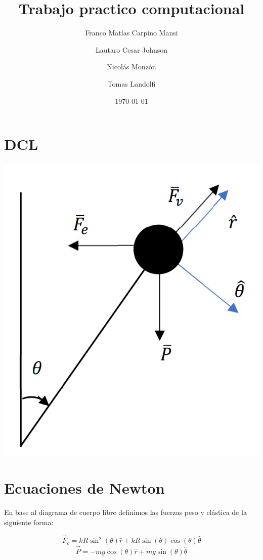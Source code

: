 \documentclass{article}
\title{Trabajo practico computacional}
\author{Franco Matías Carpino Mansi \and Lautaro Cesar Johnson \and Nicol\'as Monz\'on \and Tomas Landolfi}
\date{\today}
\begin{document}
    \maketitle
    
    \section{DCL}
    
    \begin{center}
    \includegraphics[scale=0.3]{DCL.png}
	\end{center}    
    
    \section{Ecuaciones de Newton}
    
    En base al diagrama de cuerpo libre definimos las fuerzas peso y el\'astica de la siguiente forma:
    
	$$\vec{F}_e = kR \sin^2{(\theta)} \hat{r} + kR \sin{(\theta)}\cos{(\theta)} \hat{\theta}$$
	$$\vec{P} = -mg \cos{(\theta)} \hat{r} + mg \sin {(\theta)} \hat{\theta} $$
	
\end{document}
